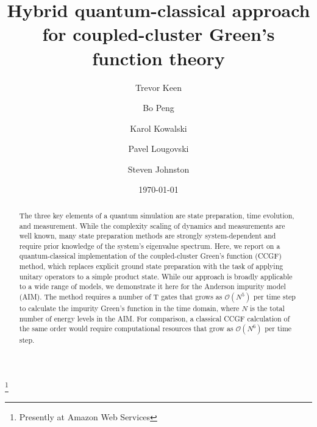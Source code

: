 \documentclass[aip,reprint,table,xcdraw,usenames,dvipsnames]{revtex4-1}
\begin{document}
\title{Hybrid quantum-classical approach for coupled-cluster Green's function theory}


\author{Trevor Keen} 
\address{Department of Physics and Astronomy, University of Tennessee, Knoxville, Tennessee 377996, United States of America}
\author{Bo Peng}
\address{Physical Sciences and Computational Division, Pacific Northwest National Laboratory, Richland, Washington 99354, United States of America}
\author{Karol Kowalski}
\address{Physical Sciences and Computational Division, Pacific Northwest National Laboratory, Richland, Washington 99354, United States of America}
\author{Pavel Lougovski}
\thanks{Presently at Amazon Web Services}
\address{Quantum Information Science Group, Computational Sciences and Engineering Division, Oak Ridge National Laboratory, Oak Ridge, Tennessee 37831, United States of America}
\author{Steven Johnston}
\address{Department of Physics and Astronomy, University of Tennessee, Knoxville, Tennessee 377996, United States of America}

\date{\today}

\begin{abstract}
The three key elements of a quantum simulation are state preparation, time evolution, and measurement. While the complexity scaling of dynamics and measurements are well known, many state preparation methods are strongly system-dependent and require prior knowledge of the system's eigenvalue spectrum. Here, we report on a quantum-classical implementation of the coupled-cluster Green's function (CCGF) method, which replaces explicit ground state preparation with the task of applying unitary operators to a simple product state.
While our approach is broadly applicable to a wide range of models, we demonstrate it here for the Anderson impurity model (AIM). The method requires a number of T gates that grows as $ \mathcal{O} \left(N^5 \right)$ per time step to calculate the impurity Green's function in the time domain, where $N$ is the total number of energy levels in the AIM. For comparison, a classical CCGF calculation of the same order would require computational resources that grow as $ \mathcal{O} \left(N^6 \right)$ per time step.
\end{abstract}

\maketitle
\end{document}
